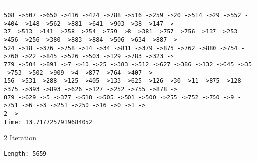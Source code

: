 \documentclass[letter, 12pt]{article}
\newenvironment{question}[1]{%
    \vspace{.2in}%
        \noindent{\bf #1}%
    \vspace{0.3em} \hrule \vspace{.1in}%
}{}
\begin{document}
\begin{question}{\large Appendix}
\begin{lstlisting}[style=CStyle]
508 ->507 ->650 ->416 ->424 ->788 ->516 ->259 ->20 ->514 ->29 ->552 ->404 ->148 ->562 ->881 ->641 ->903 ->38 ->147 ->
37 ->513 ->141 ->258 ->254 ->759 ->8 ->381 ->757 ->756 ->137 ->253 ->456 ->256 ->380 ->883 ->884 ->506 ->634 ->887 ->
524 ->18 ->376 ->758 ->14 ->34 ->811 ->379 ->876 ->762 ->880 ->754 ->760 ->22 ->845 ->526 ->503 ->129 ->783 ->323 ->
779 ->504 ->891 ->7 ->10 ->25 ->383 ->512 ->627 ->386 ->132 ->645 ->35 ->753 ->502 ->909 ->4 ->877 ->764 ->407 ->
156 ->531 ->288 ->125 ->405 ->133 ->625 ->126 ->30 ->11 ->875 ->128 ->375 ->393 ->893 ->626 ->127 ->252 ->755 ->878 ->
879 ->629 ->5 ->377 ->518 ->505 ->501 ->500 ->255 ->752 ->750 ->9 ->751 ->6 ->3 ->251 ->250 ->16 ->0 ->1 ->
2 ->
Time: 13.7177257919684052
\end{lstlisting}

2 Iteration
\begin{lstlisting}[style=CStyle]
Length: 5659


\end{lstlisting}
\end{question}
\end{document}
